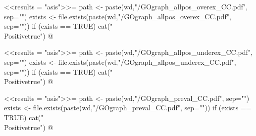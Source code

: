 \documentclass{article}
\begin{document}
\newif\ifPositive

<<results = "asis">>=
path <- paste(wd,"/GOgraph_allpos_overex_CC.pdf", sep="")
exists <- file.exists(paste(wd,"/GOgraph_allpos_overex_CC.pdf", sep=""))
if (exists == TRUE) {
  cat("\\Positivetrue")
}
@

\ifPositive
 \subsection{GOgraph showing overexpressed functions from all possible DEGs}
  This is the GO graph concerning the overexpressed DEGs from the all possible DEGs (Image extracted from {\bf"GOgraph\_allpos\_overex\_CC.pdf"} file):
  \begin{center}
    \texttt{[image: \\Sexpr\{path]}}
  \end{center}
\fi


\newif\ifPositive

<<results = "asis">>=
path <- paste(wd,"/GOgraph_allpos_underex_CC.pdf", sep="")
exists <- file.exists(paste(wd,"/GOgraph_allpos_underex_CC.pdf", sep=""))
if (exists == TRUE) {
  cat("\\Positivetrue")
}
@

\ifPositive
 \subsection{GOgraph showing underexpressed functions from all possible DEGs}
  This is the GO graph concerning the underexpressed DEGs from the all possible DEGs (Image extracted from {\bf"GOgraph\_allpos\_underex\_CC.pdf"} file):
  \begin{center}
    \texttt{[image: \\Sexpr\{path]}}
  \end{center}
\fi


\newif\ifPositive

<<results = "asis">>=
path <- paste(wd,"/GOgraph_preval_CC.pdf", sep="")
exists <- file.exists(paste(wd,"/GOgraph_preval_CC.pdf", sep=""))
if (exists == TRUE) {
  cat("\\Positivetrue")
}
@

\ifPositive
 \section{GO graphs of prevalent DEGs: Cellular Components (CC)}
  \subsection{General GOgraph from prevalent DEGs}
  This is the GO graph concerning the prevalent DEGs (Image extracted from {\bf"GOgraph\_preval\_CC.pdf"} file):
  \begin{center}
    \texttt{[image: \\Sexpr\{path]}}
  \end{center}
\fi
\end{document}
